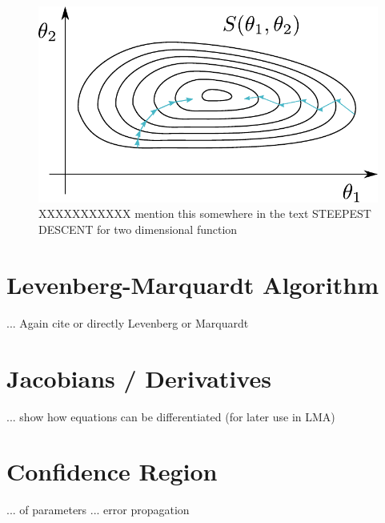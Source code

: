 \begin{figure}[hbtp]
\centering
\includegraphics[scale=1]{images/steepest_descent.pdf}
\caption{XXXXXXXXXXX mention this somewhere in the text STEEPEST DESCENT for two dimensional function}
\end{figure}



\section{Levenberg-Marquardt Algorithm}
... Again cite \cite{Seber} or directly Levenberg or Marquardt

\section{Jacobians / Derivatives}
... show how equations can be differentiated (for later use in LMA)

\section{Confidence Region}
... of parameters
... error propagation \cite{Siegwart}
